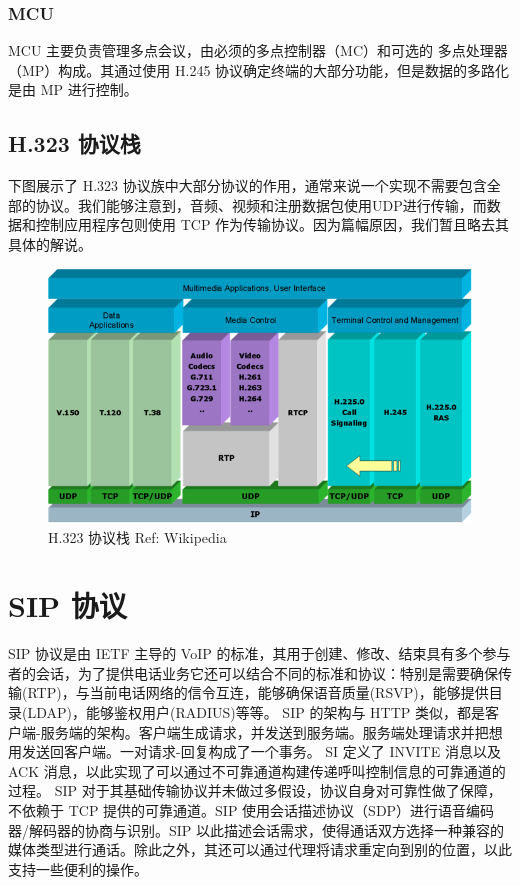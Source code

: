 \documentclass[lang=cn]{elegantpaper}
\begin{document}
\subsubsection{MCU}
MCU 主要负责管理多点会议，由必须的多点控制器（MC）和可选的
多点处理器（MP）构成。其通过使用 H.245 协议确定终端的大部分功能，但是数据的多路化是由 MP 进行控制。

\subsection{H.323 协议栈}

下图展示了 H.323 协议族中大部分协议的作用，通常来说一个实现不需要包含全部的协议。我们能够注意到，音频、视频和注册数据包使用UDP进行传输，而数据和控制应用程序包则使用 TCP 作为传输协议。因为篇幅原因，我们暂且略去其具体的解说。

\begin{figure}[H]
    \centering
    \includegraphics[width=\textwidth]{1}
    \caption{H.323 协议栈 Ref: Wikipedia}
    \label{fig:stack}
\end{figure}

\section{SIP 协议}

SIP 协议\cite{rfc2543}是由 IETF 主导的 VoIP 的标准，其用于创建、修改、结束具有多个参与者的会话，为了提供电话业务它还可以结合不同的标准和协议：特别是需要确保传输(RTP)，与当前电话网络的信令互连，能够确保语音质量(RSVP)，能够提供目录(LDAP)，能够鉴权用户(RADIUS)等等。 SIP 的架构与 HTTP 类似，都是客户端-服务端的架构。客户端生成请求，并发送到服务端。服务端处理请求并把想用发送回客户端。一对请求-回复构成了一个事务。 SI 定义了 INVITE 消息以及 ACK 消息，以此实现了可以通过不可靠通道构建传递呼叫控制信息的可靠通道的过程。 SIP 对于其基础传输协议并未做过多假设，协议自身对可靠性做了保障，不依赖于 TCP 提供的可靠通道。SIP 使用会话描述协议（SDP）进行语音编码器/解码器的协商与识别。SIP 以此描述会话需求，使得通话双方选择一种兼容的媒体类型进行通话。除此之外，其还可以通过代理将请求重定向到别的位置，以此支持一些便利的操作。
\end{document}
